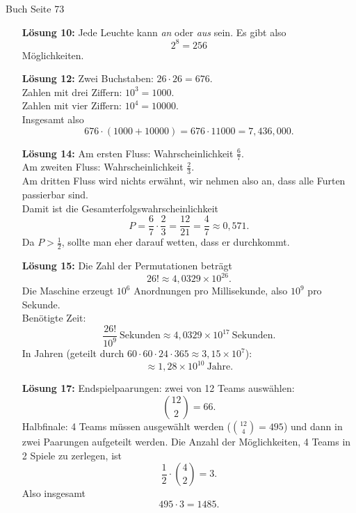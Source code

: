 \documentclass[11pt,a4paper,oneside]{article}
\begin{document}
	\newpage
	
	\begin{loesung}{Buch Seite 73}
		\begin{itemize}[left=20mm]
			\item[\textbf{Lösung 10:}] Jede Leuchte kann \emph{an} oder \emph{aus} sein. Es gibt also 
			\[ 2^8 = 256 \]
			Möglichkeiten.
			
			\item[\textbf{Lösung 12:}] 
			Zwei Buchstaben: \(26 \cdot 26 = 676\). \\
			Zahlen mit drei Ziffern: \(10^3 = 1000\). \\
			Zahlen mit vier Ziffern: \(10^4 = 10000\). \\
			Insgesamt also 
			\[ 676 \cdot (1000 + 10000) = 676 \cdot 11000 = 7{,}436{,}000. \]
			
			\item[\textbf{Lösung 14:}] 
			Am ersten Fluss: Wahrscheinlichkeit \( \tfrac{6}{7} \). \\
			Am zweiten Fluss: Wahrscheinlichkeit \( \tfrac{2}{3} \). \\
			Am dritten Fluss wird nichts erwähnt, wir nehmen also an, dass alle Furten passierbar sind. \\
			Damit ist die Gesamterfolgswahrscheinlichkeit 
			\[ P = \frac{6}{7} \cdot \frac{2}{3} = \frac{12}{21} = \frac{4}{7} \approx 0{,}571. \]
			Da \( P > \tfrac{1}{2} \), sollte man eher darauf wetten, dass er durchkommt.
			
			\item[\textbf{Lösung 15:}] 
			Die Zahl der Permutationen beträgt 
			\[ 26! \approx 4{,}0329 \times 10^{26}. \]
			Die Maschine erzeugt \(10^6\) Anordnungen pro Millisekunde, also \(10^9\) pro Sekunde. \\
			Benötigte Zeit: 
			\[ \frac{26!}{10^9} \ \text{Sekunden} \approx 4{,}0329 \times 10^{17} \ \text{Sekunden}. \]
			In Jahren (geteilt durch \(60 \cdot 60 \cdot 24 \cdot 365 \approx 3{,}15 \times 10^7\)): 
			\[ \approx 1{,}28 \times 10^{10} \ \text{Jahre}. \]
			
			\newpage
			
			\item[\textbf{Lösung 17:}] 
			Endspielpaarungen: zwei von 12 Teams auswählen: 
			\[ \binom{12}{2} = 66. \]
			Halbfinale: 4 Teams müssen ausgewählt werden (\(\binom{12}{4}=495\)) und dann in zwei Paarungen aufgeteilt werden. Die Anzahl der Möglichkeiten, 4 Teams in 2 Spiele zu zerlegen, ist 
			\[ \frac{1}{2} \cdot \binom{4}{2} = 3. \]
			Also insgesamt 
			\[ 495 \cdot 3 = 1485. \]
			

\end{itemize}
\end{loesung}
\end{document}
